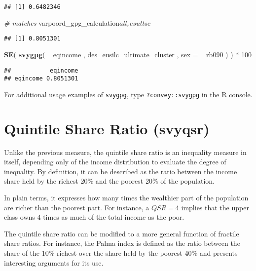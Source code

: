 \documentclass[]{book}
\newenvironment{Shaded}{\begin{snugshade}}{\end{snugshade}}
\newcommand{\KeywordTok}[1]{\textcolor[rgb]{0.13,0.29,0.53}{\textbf{{#1}}}}
\newcommand{\DataTypeTok}[1]{\textcolor[rgb]{0.13,0.29,0.53}{{#1}}}
\newcommand{\DecValTok}[1]{\textcolor[rgb]{0.00,0.00,0.81}{{#1}}}
\newcommand{\StringTok}[1]{\textcolor[rgb]{0.31,0.60,0.02}{{#1}}}
\newcommand{\CommentTok}[1]{\textcolor[rgb]{0.56,0.35,0.01}{\textit{{#1}}}}
\newcommand{\NormalTok}[1]{{#1}}
\begin{document}
\begin{verbatim}
## [1] 0.6482346
\end{verbatim}

\begin{Shaded}
\begin{Highlighting}[]
\CommentTok{# matches}
\NormalTok{varpoord_gpg_calculation$all_result$se}
\end{Highlighting}
\end{Shaded}

\begin{verbatim}
## [1] 0.8051301
\end{verbatim}

\begin{Shaded}
\begin{Highlighting}[]
\KeywordTok{SE}\NormalTok{( }\KeywordTok{svygpg}\NormalTok{( ~}\StringTok{ }\NormalTok{eqincome , des_eusilc_ultimate_cluster , }\DataTypeTok{sex =} \NormalTok{~}\StringTok{ }\NormalTok{rb090 ) ) *}\StringTok{ }\DecValTok{100}
\end{Highlighting}
\end{Shaded}

\begin{verbatim}
##           eqincome
## eqincome 0.8051301
\end{verbatim}

For additional usage examples of \texttt{svygpg}, type
\texttt{?convey::svygpg} in the R console.

\section{Quintile Share Ratio
(svyqsr)}\label{quintile-share-ratio-svyqsr}

Unlike the previous measure, the quintile share ratio is an inequality
measure in itself, depending only of the income distribution to evaluate
the degree of inequality. By definition, it can be described as the
ratio between the income share held by the richest 20\% and the poorest
20\% of the population.

In plain terms, it expresses how many times the wealthier part of the
population are richer than the poorest part. For instance, a \(QSR = 4\)
implies that the upper class owns 4 times as much of the total income as
the poor.

The quintile share ratio can be modified to a more general function of
fractile share ratios. For instance, the Palma index is defined as the
ratio between the share of the 10\% richest over the share held by the
poorest 40\% and \citet{cobham2015} presents interesting arguments for
its use.
\end{document}
